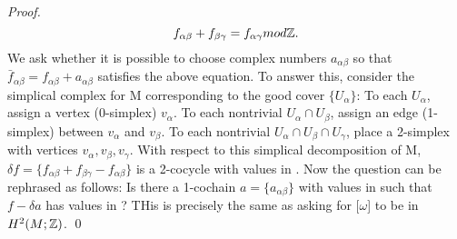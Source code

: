 \begin{theorem}
\begin{proof}
\begin{equation}
  f_{\alpha \beta} + f_{\beta \gamma} = f_{\alpha \gamma} mod \mathbb{Z}.
 \end{equation}
We ask whether it is possible to choose complex numbers $a_{\alpha \beta}$ so that $\bar{f}_{\alpha \beta} = f_{\alpha \beta}
+ a_{\alpha \beta}$ satisfies the above equation. To answer this, consider the simplical complex for M corresponding to the
good cover $\lbrace U_\alpha \rbrace$: To each $U_\alpha$, assign  a vertex (0-simplex) $v_\alpha$.
To each nontrivial $U_\alpha \cap U_\beta$, assign an edge (1-simplex) between $v_\alpha$ and $v_\beta$. To each nontrivial
$U_\alpha \cap U_\beta \cap U_\gamma$, place a 2-simplex with vertices $v_\alpha, v_\beta, v_\gamma$. With respect to 
this simplical decomposition of M, $\delta f = \lbrace f_{\alpha \beta} + f_{\beta \gamma} - f_{\alpha \beta} \rbrace$ is 
a 2-cocycle with values in \Cbb. Now the question can be rephrased as follows: Is there a 1-cochain $a= \lbrace a_{\alpha \beta}
\rbrace$ with values in \Cbb such that $f- \delta a$ has values in \Zbb? THis is precisely the same as asking for [$\omega$]
to be in $H^2(M;\mathbb{Z})$.
\qed
 \end{proof}

\end{theorem}
